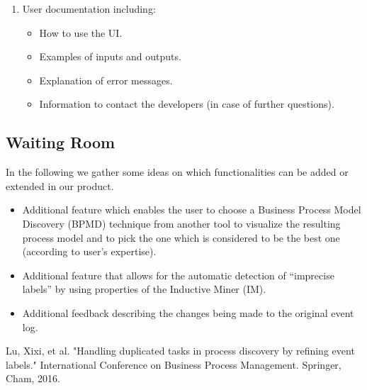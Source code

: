 \documentclass[notitlepage]{article}
\begin{document}
\begin{flushleft}
\begin{enumerate}
\item User documentation including:
\begin{itemize}
\item How to use the UI. 
\item Examples of inputs and outputs.
\item Explanation of error messages.
\item Information to contact the developers (in case of further questions).
\end{itemize}
\end{enumerate}

\subsection{Waiting Room}
In the following we gather some ideas on which functionalities can be added or extended in our product.

\begin{itemize}
\item Additional feature which enables the user to choose a Business Process Model Discovery (BPMD) technique from another tool to visualize the resulting process model and to pick the one which is considered to be the best one (according to user's expertise). 
\item Additional feature that allows for the automatic detection of “imprecise labels” by using properties of the Inductive Miner (IM).
\item Additional feedback describing the changes being made to the original event log.
\end{itemize}





\end{flushleft}
%



\begin{thebibliography}{5}
Lu, Xixi, et al. "Handling duplicated tasks in process discovery by refining event labels." International Conference on Business Process Management. Springer, Cham, 2016.










\end{thebibliography}
\end{document}

